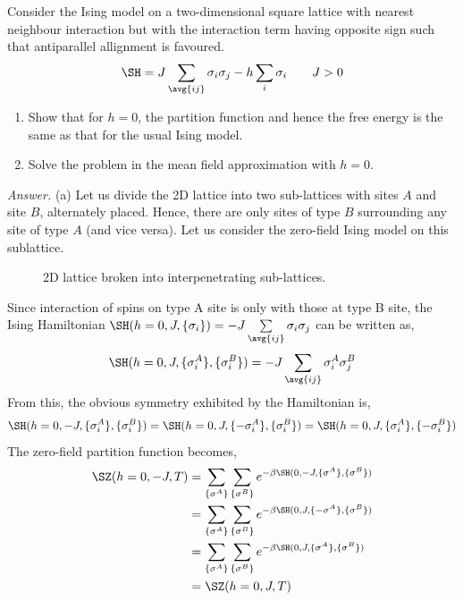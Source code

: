 \begin{question}
Consider the Ising model on a two-dimensional square lattice with nearest neighbour interaction but with the interaction term having opposite sign such that antiparallel allignment is favoured.
$$\SH = J\sum\limits_{\avg{ij}} \sigma_i \sigma_j -h\sum\limits_i \sigma_i\qquad J>0$$
\begin{enumerate}
    \item[(a)] Show that for $h = 0$, the partition function and hence the free energy is the same as that for the usual Ising model.
    \item[(b)]  Solve the problem in the mean field approximation with $h = 0$.
\end{enumerate}
\end{question}
\noindent
\textit{Answer.} (a) Let us divide the 2D lattice into two sub-lattices with sites $A$ and site $B$, alternately placed. Hence, there are only sites of type $B$ surrounding any site of type $A$ (and vice versa). Let us consider the zero-field Ising model on this sublattice. 
\begin{figure}[H]
    \centering 
    
    \caption{2D lattice broken into interpenetrating sub-lattices.}
\end{figure}
\noindent 
Since interaction of spins on type A site  is only with those at type B site, the Ising Hamiltonian $\SH(h=0, J, \{\sigma_i\}) = -J\sum\limits_{\avg{ij}}\sigma_i \sigma_j$ can be written as,
\begin{equation}
    \SH(h=0, J,\{\sigma_i^A\},\{\sigma_i^B\} ) = -J\sum\limits_{\avg{ij}}\sigma_i^A \sigma_j^B
\end{equation}
From this, the obvious symmetry exhibited by the Hamiltonian is,
\begin{equation}\label{sublat}
    \SH(h=0, -J,\{\sigma_i^A\},\{\sigma_i^B\} ) = \SH(h=0, J,\{-\sigma_i^A\},\{\sigma_i^B\} ) = \SH(h=0, J,\{\sigma_i^A\},\{-\sigma_i^B\} )
\end{equation}
The zero-field partition function becomes, 
\begin{align}
    \begin{split}
        \SZ(h=0, -J, T) &= \sum\limits_{\{\sigma^A\}}\sum\limits_{\{\sigma^B\}} e^{-\beta \SH(0, -J,\{\sigma^A\},\{\sigma^B\} )}\\
        &=\sum\limits_{\{\sigma^A\}}\sum\limits_{\{\sigma^B\}} e^{-\beta \SH(0, J,\{ -\sigma^A\},\{\sigma^B\} )}\\
        &=\sum\limits_{\{\sigma^A\}}\sum\limits_{\{\sigma^B\}} e^{-\beta \SH(0, J,\{\sigma^A\},\{\sigma^B\} )}\\
        &=\SZ(h=0, J, T)
    \end{split}
\end{align}
